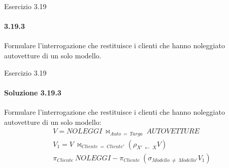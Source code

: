 %
\begin{frame}{Esercizio 3.19}
    \framesubtitle{3.19.3}
    \vspace{-3.cm}
    \vspace{.3cm}

    Formulare l'interrogazione che restituisce i clienti che hanno noleggiato autovetture di un solo modello.
\end{frame}
%
\begin{frame}{Esercizio 3.19}
    \framesubtitle{Soluzione 3.19.3}
    \vspace*{-2cm}
    \vspace{.3cm}

    {\small Formulare l'interrogazione che restituisce i clienti che hanno noleggiato autovetture di un solo modello:}
    \small
    \begin{gather*}
        V = NOLEGGI~\bowtie_{Auto~=~Targa}~AUTOVETTURE\\
        V_{1} = V~\bowtie_{Cliente~=~Cliente'} (\rho_{X'~\leftarrow~X} V)\\
        \pi_{Cliente}~NOLEGGI - \pi_{Cliente}~(\sigma_{Modello~\neq~Modello'} V_1)
    \end{gather*}
\end{frame}
%
